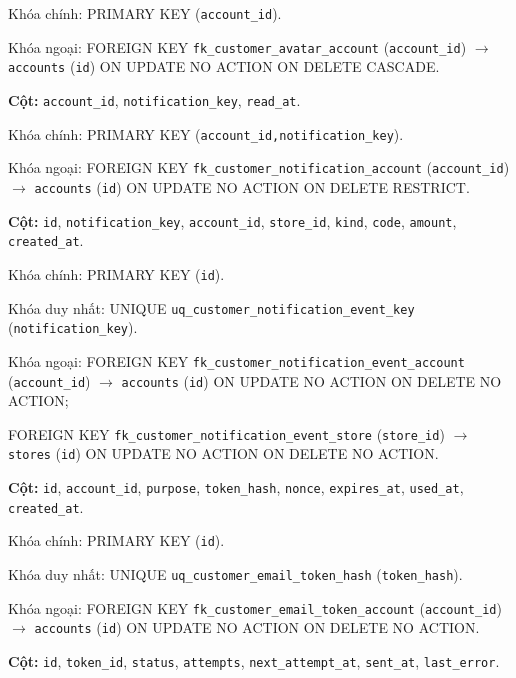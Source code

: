 \begin{description}[leftmargin=3.6cm,labelwidth=3.4cm,style=nextline]
Khóa chính: PRIMARY KEY (\texttt{account\_id}).

Khóa ngoại: FOREIGN KEY \texttt{fk\_customer\_avatar\_account} (\texttt{account\_id}) $\rightarrow$ \texttt{accounts} (\texttt{id}) ON UPDATE NO ACTION ON DELETE CASCADE.

\item[\texttt{customer\_notification\_reads}] \textbf{Cột:} \texttt{account\_id}, \texttt{notification\_key}, \texttt{read\_at}.

Khóa chính: PRIMARY KEY (\texttt{account\_id,notification\_key}).

Khóa ngoại: FOREIGN KEY \texttt{fk\_customer\_notification\_account} (\texttt{account\_id}) $\rightarrow$ \texttt{accounts} (\texttt{id}) ON UPDATE NO ACTION ON DELETE RESTRICT.

\item[\texttt{customer\_notification\_events}] \textbf{Cột:} \texttt{id}, \texttt{notification\_key}, \texttt{account\_id}, \texttt{store\_id}, \texttt{kind}, \texttt{code}, \texttt{amount}, \texttt{created\_at}.

Khóa chính: PRIMARY KEY (\texttt{id}).

Khóa duy nhất: UNIQUE \texttt{uq\_customer\_notification\_event\_key} (\texttt{notification\_key}).

Khóa ngoại: FOREIGN KEY \texttt{fk\_customer\_notification\_event\_account} (\texttt{account\_id}) $\rightarrow$ \texttt{accounts} (\texttt{id}) ON UPDATE NO ACTION ON DELETE NO ACTION;\par FOREIGN KEY \texttt{fk\_customer\_notification\_event\_store} (\texttt{store\_id}) $\rightarrow$ \texttt{stores} (\texttt{id}) ON UPDATE NO ACTION ON DELETE NO ACTION.

\item[\texttt{customer\_email\_tokens}] \textbf{Cột:} \texttt{id}, \texttt{account\_id}, \texttt{purpose}, \texttt{token\_hash}, \texttt{nonce}, \texttt{expires\_at}, \texttt{used\_at}, \texttt{created\_at}.

Khóa chính: PRIMARY KEY (\texttt{id}).

Khóa duy nhất: UNIQUE \texttt{uq\_customer\_email\_token\_hash} (\texttt{token\_hash}).

Khóa ngoại: FOREIGN KEY \texttt{fk\_customer\_email\_token\_account} (\texttt{account\_id}) $\rightarrow$ \texttt{accounts} (\texttt{id}) ON UPDATE NO ACTION ON DELETE NO ACTION.

\item[\texttt{customer\_mail\_outbox}] \textbf{Cột:} \texttt{id}, \texttt{token\_id}, \texttt{status}, \texttt{attempts}, \texttt{next\_attempt\_at}, \texttt{sent\_at}, \texttt{last\_error}.


\end{description}
